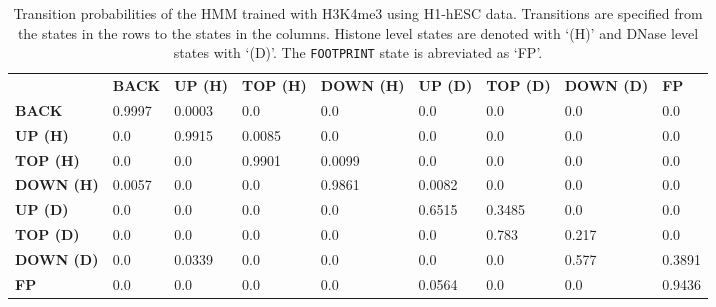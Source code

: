 \begin{table}[t]
\footnotesize
\begin{center}
\caption{Transition probabilities of the HMM trained with H3K4me3 using H1-hESC data. Transitions are specified from the states in the rows to the states in the columns. Histone level states are denoted with `(H)' and DNase level states with `(D)'. The {\tt FOOTPRINT} state is abreviated as `FP'.}
\label{tab:hmmtrans}
    \renewcommand{\arraystretch}{1.2}
    \begin{tabular}{ lllllllll }
        \hline
        & \textbf{BACK} & \textbf{UP (H)} & \textbf{TOP (H)} & \textbf{DOWN (H)} & \textbf{UP (D)}
        & \textbf{TOP (D)} & \textbf{DOWN (D)} & \textbf{FP} \\
        \textbf{BACK}     & 0.9997 & 0.0003 & 0.0    & 0.0    & 0.0    & 0.0    & 0.0   & 0.0    \\
        \textbf{UP (H)}   & 0.0    & 0.9915 & 0.0085 & 0.0    & 0.0    & 0.0    & 0.0   & 0.0    \\
        \textbf{TOP (H)}  & 0.0    & 0.0    & 0.9901 & 0.0099 & 0.0    & 0.0    & 0.0   & 0.0    \\
        \textbf{DOWN (H)} & 0.0057 & 0.0    & 0.0    & 0.9861 & 0.0082 & 0.0    & 0.0   & 0.0    \\
        \textbf{UP (D)}   & 0.0    & 0.0    & 0.0    & 0.0    & 0.6515 & 0.3485 & 0.0   & 0.0    \\
        \textbf{TOP (D)}  & 0.0    & 0.0    & 0.0    & 0.0    & 0.0    & 0.783  & 0.217 & 0.0    \\
        \textbf{DOWN (D)} & 0.0    & 0.0339 & 0.0    & 0.0    & 0.0    & 0.0    & 0.577 & 0.3891 \\
        \textbf{FP}       & 0.0    & 0.0    & 0.0    & 0.0    & 0.0564 & 0.0    & 0.0   & 0.9436 \\
        \hline
    \end{tabular}
\end{center}
\end{table}

